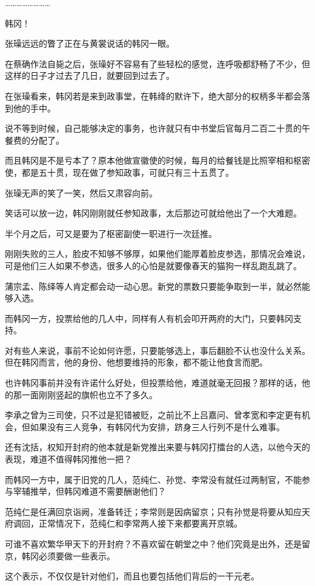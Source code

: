 ……………………

韩冈！

张璪远远的瞥了正在与黄裳说话的韩冈一眼。

在蔡确作法自毙之后，张璪好不容易有了些轻松的感觉，连呼吸都舒畅了不少，但这样的日子才过去了几日，就要回到过去了。

在张璪看来，韩冈若是来到政事堂，在韩绛的默许下，绝大部分的权柄多半都会落到他的手中。

说不等到时候，自己能够决定的事务，也许就只有中书堂后官每月二百二十贯的午餐费的分配了。

而且韩冈是不是亏本了？原本他做宣徽使的时候，每月的给餐钱是比照宰相和枢密使，都是五十贯，现在做了参知政事，可就只有三十五贯了。

张璪无声的笑了一笑，然后又肃容向前。

笑话可以放一边，韩冈刚刚就任参知政事，太后那边可就给他出了一个大难题。

半个月之后，可又是要为了枢密副使一职进行一次廷推。

刚刚失败的三人，脸皮不知够不够厚，如果他们能厚着脸皮参选，那情况会难说，可是他们三人如果不参选，很多人的心怕是就要像春天的猫狗一样乱跑乱跳了。

蒲宗孟、陈绎等人肯定都会动一动心思。新党的票数只要能争取到一半，就必然能够入选。

而韩冈一方，投票给他的几人中，同样有人有机会叩开两府的大门，只要韩冈支持。

对有些人来说，事前不论如何许愿，只要能够选上，事后翻脸不认也没什么关系。但在韩冈而言，他的身份、他想要维持的形象，都不能让他食言而肥。

也许韩冈事前并没有许诺什么好处，但投票给他，难道就毫无回报？那样的话，他的那一面刚刚竖起的旗帜也立不了多久。

李承之曾为三司使，只不过是犯错被贬，之前比不上吕嘉问、曾孝宽和李定更有机会，但如果没有三人竞争，有韩冈代为安排，跻身三人行列不是什么难事。

还有沈括，权知开封府的他本就是新党推出来要与韩冈打擂台的人选，以他今天的表现，难道不值得韩冈推他一把？

而韩冈一方中，属于旧党的几人，范纯仁、孙觉、李常没有就任过两制官，不能参与宰辅推举，但韩冈难道不需要酬谢他们？

范纯仁是任满回京诣阙，准备转迁；李常则是因病留京；只有孙觉是将要从知应天府调回，正常情况下，范纯仁和李常两人接下来都要离开京城。

可谁不喜欢繁华甲天下的开封府？不喜欢留在朝堂之中？他们究竟是出外，还是留京，韩冈必须要做一些表示。

这个表示，不仅仅是针对他们，而且也要包括他们背后的一干元老。

